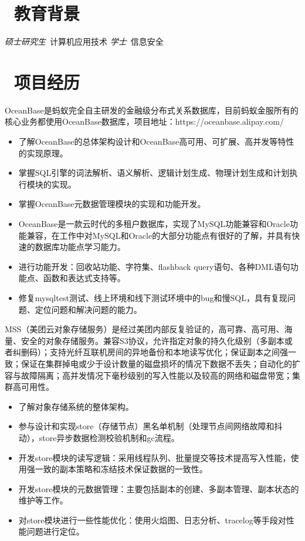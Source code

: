 \documentclass{resume}
\begin{document}


\section{\faGraduationCap\  教育背景}
\textit{硕士研究生}\ 计算机应用技术
\datedsubsection{\textbf{电子科技大学}}{2009 -- 2013}
\textit{学士}\ 信息安全\

\section{\faUsers\ 项目经历}
OceanBase是蚂蚁完全自主研发的金融级分布式关系数据库，目前蚂蚁金服所有的核心业务都使用OceanBase数据库，项目地址：https://oceanbase.alipay.com/
\begin{itemize}
  \item 了解OceanBase的总体架构设计和OceanBase高可用、可扩展、高并发等特性的实现原理。
  \item 掌握SQL引擎的词法解析、语义解析、逻辑计划生成、物理计划生成和计划执行模块的实现。
  \item 掌握OceanBase元数据管理模块的实现和功能开发。
  \item OceanBase是一款云时代的多租户数据库，实现了MySQL功能兼容和Oracle功能兼容，在工作中对MySQL和Oracle的大部分功能点有很好的了解，并具有快速的数据库功能点学习能力。
  \item 进行功能开发：回收站功能、字符集、flashback query语句、各种DML语句功能点、函数和表达式支持等。
  \item 修复mysqltest测试、线上环境和线下测试环境中的bug和慢SQL，具有复现问题、定位问题和解决问题的能力。
\end{itemize}

MSS（美团云对象存储服务）是经过美团内部反复验证的，高可靠、高可用、海量、安全的对象存储服务。兼容S3协议，允许指定对象的持久化级别（多副本或者纠删码）；支持光纤互联机房间的异地备份和本地读写优化；保证副本之间强一致；保证在集群掉电或少于设计数量的磁盘损坏的情况下数据不丢失；自动化的扩容与故障隔离；高并发情况下毫秒级别的写入性能以及较高的网络和磁盘带宽；集群高可用性。
\begin{itemize}
  \item 了解对象存储系统的整体架构。
  \item 参与设计和实现store（存储节点）黑名单机制（处理节点间网络故障和抖动），store异步数据检测校验机制和gc流程。
  \item 开发store模块的读写逻辑：采用线程队列、批量提交等技术提高写入性能，使用强一致的副本策略和冻结技术保证数据的一致性。
  \item 开发store模块的元数据管理：主要包括副本的创建、多副本管理、副本状态的维护等工作。
  \item 对store模块进行一些性能优化：使用火焰图、日志分析、tracelog等手段对性能问题进行定位。
\end{itemize}
\end{document}
